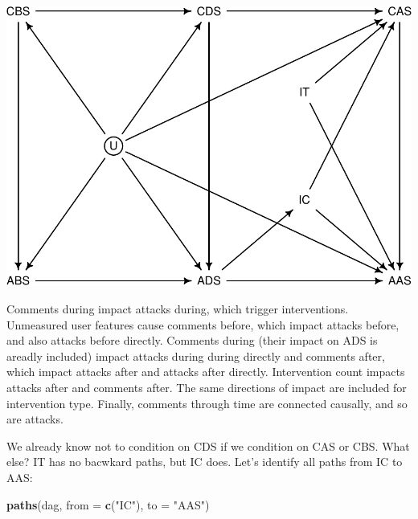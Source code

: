 \documentclass[10pt,dvipsnames,enabledeprecatedfontcommands]{scrartcl}
\newenvironment{Shaded}{\begin{snugshade}}{\end{snugshade}}
\newcommand{\KeywordTok}[1]{\textcolor[rgb]{0.13,0.29,0.53}{\textbf{#1}}}
\newcommand{\DataTypeTok}[1]{\textcolor[rgb]{0.13,0.29,0.53}{#1}}
\newcommand{\StringTok}[1]{\textcolor[rgb]{0.31,0.60,0.02}{#1}}
\newcommand{\NormalTok}[1]{#1}
\begin{document}
\begin{center}\includegraphics[width=0.8\linewidth]{bayesianReport_files/figure-latex/dag1-1} \end{center}

\normalsize

Comments during impact attacks during, which trigger interventions.
Unmeasured user features cause comments before, which impact attacks
before, and also attacks before directly. Comments during (their impact
on ADS is areadly included) impact attacks during during directly and
comments after, which impact attacks after and attacks after directly.
Intervention count impacts attacks after and comments after. The same
directions of impact are included for intervention type. Finally,
comments through time are connected causally, and so are attacks.

We already know not to condition on CDS if we condition on CAS or CBS.
What else? \textsf{IT} has no bacwkard paths, but \textsf{IC} does.
Let's identify all paths from \textsf{IC} to \textsf{AAS}:

\vspace{1mm} \footnotesize

\begin{Shaded}
\begin{Highlighting}[]
\KeywordTok{paths}\NormalTok{(dag, }\DataTypeTok{from =} \KeywordTok{c}\NormalTok{(}\StringTok{"IC"}\NormalTok{), }\DataTypeTok{to =} \StringTok{"AAS"}\NormalTok{)}
\end{Highlighting}
\end{Shaded}
\end{document}
